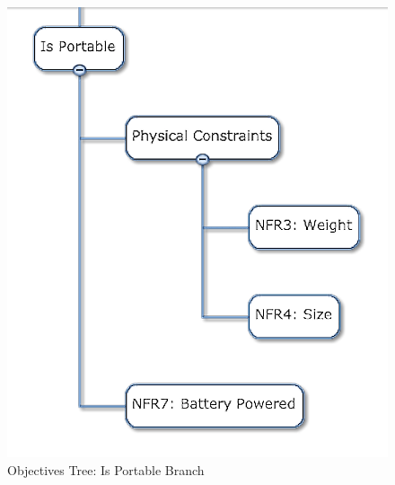 \begin{figure}[!ht]
\centering
\includegraphics[width=0.98\columnwidth]{figs/objectives_tree/objectives_tree_portable.png}
\caption{Objectives Tree: Is Portable Branch}
\label{fig:obj_tree_portable}
\end{figure}

